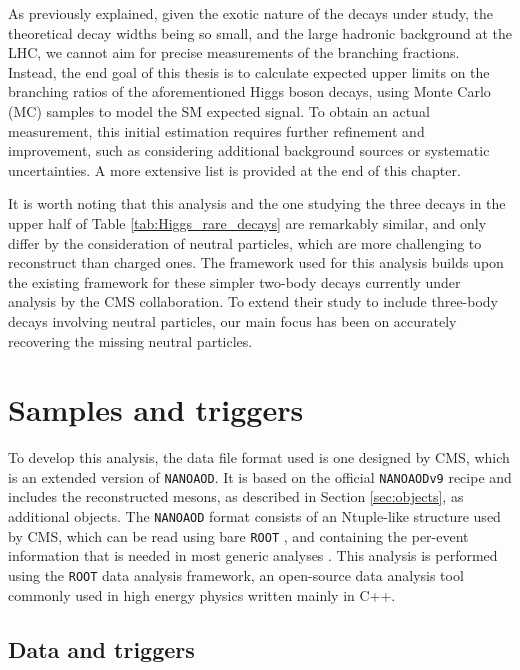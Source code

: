 As previously explained, given the exotic nature of the decays under study, the theoretical decay widths being so small, and the large hadronic background at the LHC, we cannot aim for precise measurements of the branching fractions. Instead, the end goal of this thesis is to calculate expected upper limits on the branching ratios of the aforementioned Higgs boson decays, using Monte Carlo (MC) samples to model the SM expected signal. To obtain an actual measurement, this initial estimation requires further refinement and improvement, such as considering additional background sources or systematic uncertainties. A more extensive list is provided at the end of this chapter.

It is worth noting that this analysis and the one studying the three decays in the upper half of Table \ref{tab:Higgs_rare_decays} are remarkably similar, and only differ by the consideration of neutral particles, which are more challenging to reconstruct than charged ones. The framework used for this analysis builds upon the existing framework for these simpler two-body decays currently under analysis by the CMS collaboration. To extend their study to include three-body decays involving neutral particles, our main focus has been on accurately recovering the missing neutral particles.

\section{Samples and triggers}\label{sec:samples_triggers}

To develop this analysis, the data file format used is one designed by CMS, which is an extended version of \verb+NANOAOD+. It is based on the official \verb+NANOAODv9+ recipe and includes the reconstructed mesons, as described in Section \ref{sec:objects}, as additional objects. The \verb+NANOAOD+ format consists of an Ntuple-like structure used by CMS, which can be read using bare \verb+ROOT+ \cite{CERN:root}, and containing the per-event information that is needed in most generic analyses \cite{CMS:NanoAOD}. This analysis is performed using the \verb+ROOT+ data analysis framework, an open-source data analysis tool commonly used in high energy physics written mainly in C++.

\subsection{Data and triggers}\label{subsec:data_tau_trigger}


